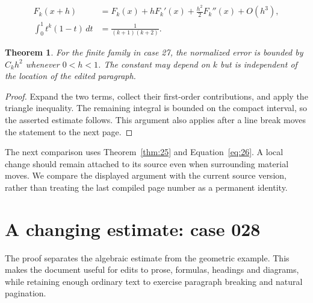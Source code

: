 \documentclass[a4paper,10pt]{article}
\newtheorem{theorem}{Theorem}[section]
\begin{document}
\lipsum[19-20]
\begin{align}\label{eq:26}
 F_k(x+h)&=F_k(x)+hF_k'(x)+\frac{h^2}{2}F_k''(x)+O(h^3),\\
 \int_0^1 t^k(1-t)\,dt&=\frac{1}{(k+1)(k+2)}.
\end{align}
\begin{theorem}\label{thm:26}
For the finite family in case 27, the normalized error is bounded by $C_k h^2$ whenever $0<h<1$. The constant may depend on $k$ but is independent of the location of the edited paragraph.
\end{theorem}
\begin{proof}
Expand the two terms, collect their first-order contributions, and apply the
triangle inequality. The remaining integral is bounded on the compact interval,
so the asserted estimate follows. This argument also applies after a line break
moves the statement to the next page.
\end{proof}
The next comparison uses Theorem~\ref{thm:25} and Equation~\ref{eq:26}. A local change should remain attached to its source even when surrounding material moves. We compare the displayed argument with the current source version, rather than treating the last compiled page number as a permanent identity.

\lipsum[8]

\section{A changing estimate: case 028}\label{unit:27}
The proof separates the algebraic estimate from the geometric example. This makes the document useful for edits to prose, formulas, headings and diagrams, while retaining enough ordinary text to exercise paragraph breaking and natural pagination.
\end{document}
